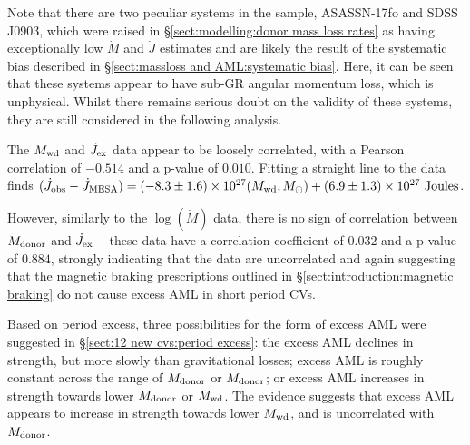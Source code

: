 Note that there are two peculiar systems in the sample, ASASSN-17fo and SDSS J0903, which were raised in \S\ref{sect:modelling:donor mass loss rates} as having exceptionally low $\dot M$ and $\dot J$ estimates and are likely the result of the systematic bias described in \S\ref{sect:massloss and AML:systematic bias}. Here, it can be seen that these systems appear to have sub-GR angular momentum loss, which is unphysical. Whilst there remains serious doubt on the validity of these systems, they are still considered in the following analysis.

The $M_{\rm wd}$ and $\dot J_{\rm ex}$ data appear to be loosely correlated, with a Pearson correlation of $-0.514$ and a p-value of $0.010$. Fitting a straight line to the data finds $(\dot J_{\rm obs} - \dot J_{\rm MESA}) = (-8.3\pm1.6) \times 10^{27}(M_{\rm wd}, M_\odot) + (6.9\pm1.3)\times10^{27}~{\rm Joules}$.

However, similarly to the $\log (\dot M)$ data, there is no sign of correlation between $M_{\rm donor}$ and $\dot J_{\rm ex}$ -- these data have a correlation coefficient of $0.032$ and a p-value of $0.884$, strongly indicating that the data are uncorrelated and again suggesting that the magnetic braking prescriptions outlined in \S\ref{sect:introduction:magnetic braking} do not cause excess AML in short period CVs.

Based on period excess, three possibilities for the form of excess AML were suggested in \S\ref{sect:12 new cvs:period excess}: the excess AML declines in strength, but more slowly than gravitational losses; excess AML is roughly constant across the range of $M_{\rm donor}$ or $M_{\rm donor}$; or excess AML increases in strength towards lower $M_{\rm donor}$ or $M_{\rm wd}$.
The evidence suggests that excess AML appears to increase in strength towards lower $M_{\rm wd}$, and is uncorrelated with $M_{\rm donor}$.


